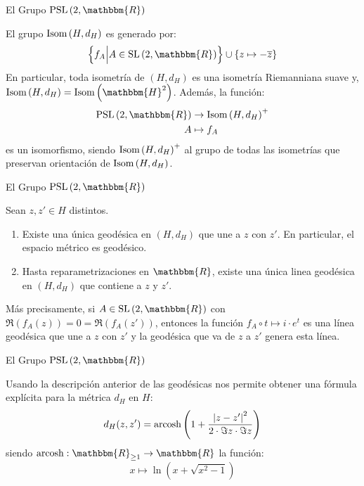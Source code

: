 \documentclass[xcolor=dvipsnames]{beamer}
\theoremstyle{largebreak}
\newcommand\abs[1]{\ensuremath{\left|#1\right|}}
\newcommand\cf[3]{\ensuremath{#1:#2\rightarrow#3}}
\newcommand{\bbm}[1]{\ensuremath{\mathbbm{#1}}}
\newcommand{\Isom}[1]{\ensuremath{\textup{Isom}\left(#1\right)}}
\newcommand{\SL}[1]{\ensuremath{\textup{SL}\left(#1\right)}}
\newcommand{\PSL}[1]{\ensuremath{\textup{PSL}\left(#1\right)}}
\newcommand{\arcosh}[1]{\ensuremath{\textup{arcosh}\left(#1\right)}}
\begin{document}
\begin{frame}{El Grupo $\PSL{2,\bbm{R}}$}
    \begin{theor}
        El grupo $\Isom{H,d_H}$ es generado por:
        \begin{equation*}
            \left\{f_A\Big|A\in\SL{2,\bbm{R}} \right\}\cup\left\{z\mapsto-\overline{z} \right\}
        \end{equation*}
        En particular, toda isometría de $(H,d_H)$ es una isometría Riemanniana suave y, $\Isom{H,d_H}=\Isom{\bbm{H}^2}$. Además, la función:
        \begin{equation*}
            \begin{split}
                \PSL{2,\bbm{R}}&\rightarrow\Isom{H,d_H}^+\\
                A&\mapsto f_A\\
            \end{split}
        \end{equation*}
        es un isomorfismo, siendo $\Isom{H,d_H}^+$ al grupo de todas las isometrías que preservan orientación de $\Isom{H,d_H}$.
    \end{theor}
\end{frame}

\begin{frame}{El Grupo $\PSL{2,\bbm{R}}$}
    \begin{theor}
        \label{caracterizacionGeodesicas}
        Sean $z,z'\in H$ distintos.
        \begin{enumerate}[label = \textit{(\arabic*)}]
            \item Existe una única geodésica en $(H,d_H)$ que une a $z$ con $z'$. En particular, el espacio métrico es geodésico.
            \item Hasta reparametrizaciones en $\bbm{R}$, existe una única linea geodésica en $(H,d_H)$ que contiene a $z$ y $z'$. 
        \end{enumerate}
        Más precisamente, si $A\in\SL{2,\bbm{R}}$ con $\Re(f_A(z))=0=\Re(f_A(z'))$, entonces la función $f_A\circ t\mapsto i\cdot e^{ t}$ es una línea geodésica que une a $z$ con $z'$ y la geodésica que va de $z$ a $z'$ genera esta línea.
    \end{theor}
\end{frame}

\begin{frame}{El Grupo $\PSL{2,\bbm{R}}$}
    \begin{obs}
        Usando la descripción anterior de las geodésicas nos permite obtener una fórmula explícita para la métrica $d_H$ en $H$:
        \begin{equation*}
            d_H(z,z')=\arcosh{1+\frac{\abs{z-z'}^2}{2\cdot\Im{z}\cdot\Im{z}}}
        \end{equation*}
        siendo $\cf{\textup{arcosh}}{\bbm{R}_{\geq1}}{\bbm{R}}$ la función:
        \begin{equation*}
            x\mapsto\ln\left(x+\sqrt{x^2-1} \right)
        \end{equation*}
    \end{obs}
\end{frame}
\end{document}

